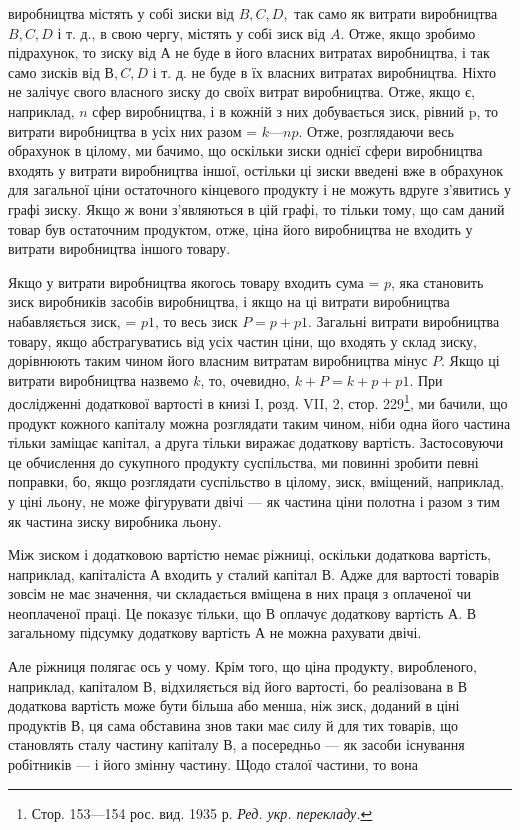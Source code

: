 \parcont{}  %
виробництва містять у собі зиски від $B, C, D,$ так само як витрати виробництва $B, C, D$ і т. д., в
свою чергу, містять у собі
зиск від $A$. Отже, якщо зробимо підрахунок, то зиску від $А$ не
буде в його власних витратах виробництва, і так само зисків
від $В, C, D$ і т. д. не буде в їх власних витратах виробництва.
Ніхто не залічує свого власного зиску до своїх витрат виробництва. Отже, якщо є, наприклад, $n$ сфер
виробництва, і в кожній з них добувається зиск, рівний p, то витрати виробництва в усіх них разом =
$k — np$. Отже, розглядаючи весь обрахунок
в цілому, ми бачимо, що оскільки зиски однієї сфери виробництва входять у витрати виробництва іншої,
остільки ці зиски
введені вже в обрахунок для загальної ціни остаточного кінцевого
продукту і не можуть вдруге з’явитись у графі зиску. Якщо ж
вони з’являються в цій графі, то тільки тому, що сам даний
товар був остаточним продуктом, отже, ціна його виробництва
не входить у витрати виробництва іншого товару.

Якщо у витрати виробництва якогось товару входить сума = $p$, яка становить зиск виробників засобів
виробництва, і якщо
на ці витрати виробництва набавляється зиск, = $p1$, то весь зиск
$P = p + p1$. Загальні витрати виробництва товару, якщо абстрагуватись від усіх частин ціни, що
входять у склад зиску, дорівнюють таким чином його власним витратам виробництва мінус $P$.
Якщо ці витрати виробництва назвемо $k$, то, очевидно, $k + P = k + p + p1$. При дослідженні додаткової
вартості в книзі I,
розд. VII, 2, стор. 229\footnote*{Стор. 153—154 рос. вид. 1935 р. \emph{Ред. укр. перекладу.}}, ми бачили, що продукт кожного капіталу можна розглядати таким чином, ніби
одна його частина
тільки заміщає капітал, а друга тільки виражає додаткову вартість. Застосовуючи це обчислення до
сукупного продукту
суспільства, ми повинні зробити певні поправки, бо, якщо
розглядати суспільство в цілому, зиск, вміщений, наприклад,
у ціні льону, не може фігурувати двічі — як частина ціни полотна
і разом з тим як частина зиску виробника льону.

Між зиском і додатковою вартістю немає ріжниці, оскільки
додаткова вартість, наприклад, капіталіста $А$ входить у сталий
капітал $В$. Адже для вартості товарів зовсім не має значення, чи
складається вміщена в них праця з оплаченої чи неоплаченої праці.
Це показує тільки, що $В$ оплачує додаткову вартість $А$. В загальному підсумку додаткову вартість $А$ не
можна рахувати двічі.

Але ріжниця полягає ось у чому. Крім того, що ціна продукту,
виробленого, наприклад, капіталом $В$, відхиляється від його вартості, бо реалізована в $В$ додаткова
вартість може бути більша
або менша, ніж зиск, доданий в ціні продуктів $В$, ця сама обставина
знов таки має силу й для тих товарів, що становлять сталу
частину капіталу $В$, а посередньо — як засоби існування робітників — і його змінну частину. Щодо
сталої частини, то вона
\parbreak{}  %

